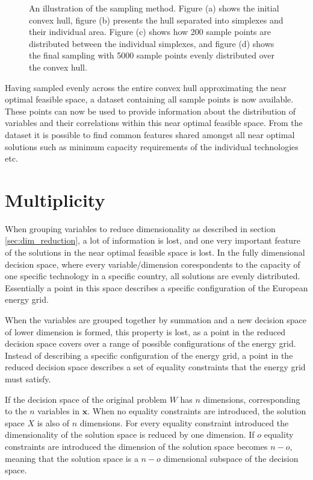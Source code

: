 \begin{figure}[h]
\begin{subfigure}{.45\textwidth}
		\caption{}
		\label{fig:sampling_4}
	\end{subfigure}
	\caption{An illustration of the sampling method. Figure (a)  shows the initial convex hull, figure (b) presents the hull separated into simplexes and their individual area. Figure (c) shows how 200 sample points are distributed between the individual simplexes, and figure (d) shows the final sampling with 5000 sample points evenly distributed over the convex hull.}
\end{figure}


Having sampled evenly across the entire convex hull approximating the near optimal feasible space, a dataset containing all sample points is now available. These points can now be used to provide information about the distribution of variables and their correlations within this near optimal feasible space. From the dataset it is possible to find common features shared amongst all near optimal solutions such as minimum capacity requirements of the individual technologies etc. 


\section{Multiplicity }\label{sec:Multiplicity}

When grouping variables to reduce dimensionality as described in section \ref{sec:dim_reduction}, a lot of information is lost, and one very important feature of the solutions in the near optimal feasible space is lost. In the fully dimensional decision space, where every variable/dimension corespondents to the capacity of one specific technology in a specific country, all solutions are evenly distributed. Essentially a point in this space describes a specific configuration of the European energy grid. 

When the variables are grouped together by summation and a new decision space of lower dimension is formed, this property is lost, as a point in the reduced decision space covers over a range of possible configurations of the energy grid. Instead of describing a specific configuration of the energy grid, a point in the reduced decision space describes a set of equality constraints that the energy grid must satisfy. 

If the decision space of the original problem $W$ has $n$ dimensions, corresponding to the $n$ variables in $\mathbf{x}$. When no equality constraints are introduced, the solution space $X$ is also of $n$ dimensions. For every equality constraint introduced the dimensionality of the solution space is reduced by one dimension. If $o$ equality constraints are introduced the dimension of the solution space becomes $n-o$, meaning that the solution space is a $n-o$ dimensional subspace of the decision space. 

